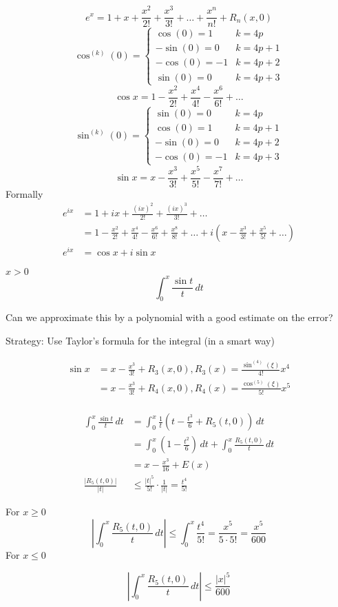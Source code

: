 \[e^x = 1 + x + \frac{x^2}{2!} + \frac{x^3}{3!} + \dotsc + \frac{x^n}{n!} + R_n(x, 0)\]
\[\cos^{(k)}(0) = \begin{cases}
  \cos(0) = 1 & k = 4p\\
  -\sin(0) = 0 & k = 4p + 1\\
  -\cos(0) = -1 & k = 4p + 2\\
  \sin(0) = 0 & k = 4p + 3
\end{cases}\]
\[\cos x = 1 - \frac{x^2}{2!} + \frac{x^4}{4!} - \frac{x^6}{6!} + \dotsc \]
\[\sin^{(k)}(0) = \begin{cases}
  \sin(0) = 0 & k = 4p\\
  \cos(0) = 1 & k = 4p + 1\\
  -\sin(0) = 0 & k = 4p + 2\\
  -\cos(0) = -1 & k = 4p + 3
\end{cases}\]
\[\sin x = x - \frac{x^3}{3!} + \frac{x^5}{5!} - \frac{x^7}{7!} + \dotsc \]
Formally
\begin{align*}
  e^{ix} &= 1 + ix + \frac{(ix)^2}{2!} + \frac{(ix)^3}{3!} + \dotsc \\
  &= 1 - \frac{x^2}{2!} + \frac{x^4}{4!} - \frac{x^6}{6!} + \frac{x^8}{8!} + \dotsc + i\left( x - \frac{x^3}{3!} + \frac{x^5}{5!} + \dotsc \right)\\
  e^{ix} &= \cos x + i\sin x
\end{align*}

\begin{example*}
  $x > 0$
  \[\int_0^x \frac{\sin t}{t}\, dt\]

  Can we approximate this by a polynomial with a good estimate on the error?
\end{example*}

Strategy: Use Taylor's formula for the integral (in a smart way)

\begin{align*}
  \sin x &= x - \frac{x^3}{3!} + R_3(x, 0), R_3(x) = \frac{\sin^{(4)}(\xi)}{4!}x^4 \\
  &= x - \frac{x^3}{3!} + R_4(x, 0), R_4(x) = \frac{\cos^{(5)} (\xi)}{5!}x^5 \\ 
\end{align*}

\begin{align*}
  \int_0^x \frac{\sin t}{t}\, dt &= \int_0^x \frac{1}{t}\left(t - \frac{t^3}{6} + R_5(t, 0) \right)\, dt \\
  &= \int_0^x \left(1 - \frac{t^2}{6}\right)\,dt + \int_0^x \frac{R_5(t, 0)}{t}\, dt \\
  &= x-\frac{x^3}{16} + E(x) \\
  \frac{|R_5(t, 0)|}{|t|}&\le \frac{|t|^5}{5!}\cdot\frac{1}{|t|} = \frac{t^4}{5!} 
\end{align*}

For $x \ge 0$
\[\left|\int_0^x \frac{R_5(t, 0)}{t} \, dt \right|\le \int_0^x \frac{t^4}{5!} = \frac{x^5}{5\cdot5!} = \frac{x^5}{600}\]
For $x \le 0$

\[\left|\int_0^x \frac{R_5(t, 0)}{t} \, dt\right| \le \frac{|x|^5}{600}\]




